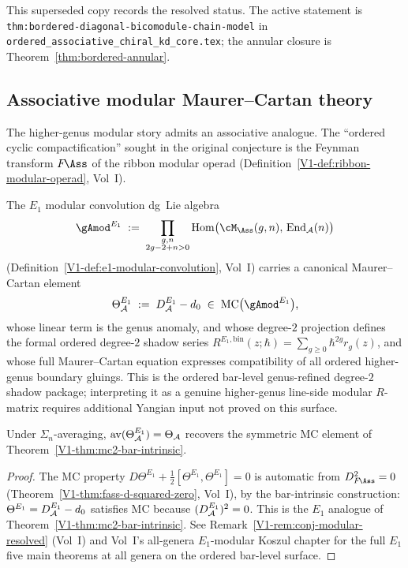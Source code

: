 \begin{remark}
This superseded copy records the resolved status. The active statement
is \texttt{thm:bordered-diagonal-bicomodule-chain-model} in
\texttt{ordered\_associative\_chiral\_kd\_core.tex}; the annular
closure is Theorem~\ref{thm:bordered-annular}.
\end{remark}

\subsection{Associative modular Maurer--Cartan theory}

The higher-genus modular story admits an associative analogue.
The ``ordered cyclic compactification'' sought in the original
conjecture is the Feynman transform $F\!\Ass$ of the ribbon modular
operad (Definition~\ref*{V1-def:ribbon-modular-operad}, Vol~I).

\begin{theorem}
The $E_1$ modular convolution dg~Lie algebra
\[
{\gAmod}^{E_1}
\;:=\;
\prod_{\substack{g,n \\ 2g-2+n>0}}
\operatorname{Hom}\bigl(
\cM_{\Ass}(g,n),\,\operatorname{End}_\cA(n)
\bigr)
\]
\textup{(}Definition~\textup{\ref*{V1-def:e1-modular-convolution}},
Vol~I\textup{)}
carries a canonical Maurer--Cartan element
\[
\Theta_\cA^{E_1}
\;:=\;
D_\cA^{E_1} - d_0
\;\in\;
\MC\bigl({\gAmod}^{E_1}\bigr),
\]
whose linear term is the genus anomaly, and whose degree-$2$
projection defines the formal ordered degree-$2$ shadow series
$R^{E_1,\mathrm{bin}}(z;\hbar)=\sum_{g\ge 0}\hbar^{2g}r_g(z)$, and
whose full
Maurer--Cartan equation expresses compatibility of all ordered
higher-genus boundary gluings. This is the ordered bar-level
genus-refined degree-$2$ shadow package; interpreting it as a genuine
higher-genus line-side modular $R$-matrix requires additional Yangian
input not proved on this surface.

Under $\Sigma_n$-averaging\textup{,}
$\operatorname{av}(\Theta_{\mathcal{A}}^{E_1}) = \Theta_{\mathcal{A}}$
recovers the symmetric MC element of
Theorem~\textup{\ref*{V1-thm:mc2-bar-intrinsic}}.
\end{theorem}

\begin{proof}
The MC property $D\Theta^{E_1} + \tfrac12[\Theta^{E_1},\Theta^{E_1}]
= 0$ is automatic from $D_{F\!\Ass}^2 = 0$
(Theorem~\ref*{V1-thm:fass-d-squared-zero}, Vol~I), by the bar-intrinsic
construction: $\Theta^{E_1} = D^{E_1}_{\mathcal{A}} - d_0$ satisfies MC
because $(D^{E_1}_{\mathcal{A}})^2 = 0$. This is the $E_1$ analogue of
Theorem~\ref*{V1-thm:mc2-bar-intrinsic}.
See Remark~\ref*{V1-rem:conj-modular-resolved} (Vol~I) and
Vol~I's all-genera $E_1$-modular Koszul chapter for the full $E_1$ five
main theorems at all genera on the ordered bar-level surface.
\end{proof}

